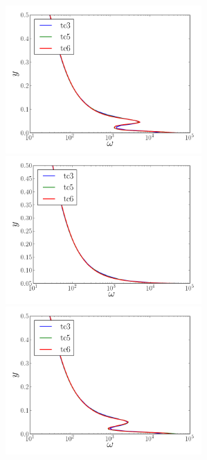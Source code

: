 \documentclass[12pt,oneside,a4paper]{article}
\begin{document}
\begin{figure}
\centering
\includegraphics[width=7.5cm]{images/CFD_meshIndependence/X1_omega.png}\hfill \includegraphics[width=7.5cm]{images/CFD_meshIndependence/X2_omega.png}\\
\includegraphics[width=7.5cm]{images/CFD_meshIndependence/X3_omega.png}
\end{figure}
\end{document}
